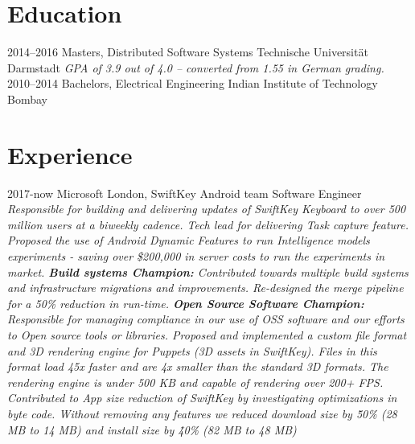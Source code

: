 \documentclass[]{friggeri-cv}
\begin{document}
\section{Education}
    \begin{entrylist}
        \entry
            {2014–2016}
            {Masters, {\normalfont Distributed Software Systems}}
            {Technische Universität Darmstadt}
            {\emph{GPA of 3.9 out of 4.0 -- converted from 1.55 in German grading.}}
        \entry
            {2010–2014}
            {Bachelors, {\normalfont Electrical Engineering}}
            {Indian Institute of Technology Bombay}
            {}%
    \end{entrylist}
    \vspace{-0.3cm}

\section{Experience}
    \begin{entrylist}
        \entry
            {2017-now}
            {Microsoft London, SwiftKey Android team}
            {Software Engineer}
            {\emph{Responsible for building and delivering updates of SwiftKey Keyboard to over 500 million users at a biweekly cadence.
    	    \newline 
    	    \newline
    	    Tech lead for delivering Task capture feature. Proposed the use of Android Dynamic Features to run Intelligence models experiments - saving over \$200,000 in server costs to run the experiments in market.
    	    \newline 
    	    \newline
    	    \textbf{Build systems Champion:} Contributed towards multiple build systems and infrastructure migrations and improvements. Re-designed the merge pipeline for a 50\% reduction in run-time.
            \newline
            \newline
            \textbf{Open Source Software Champion:} Responsible for managing compliance in our use of OSS software and our efforts to Open source tools or libraries.
    	    \newline 
    	    \newline
    	    Proposed and implemented a custom file format and 3D rendering engine for Puppets (3D assets in SwiftKey). Files in this format load 45x faster and are 4x smaller than the standard 3D formats. The rendering engine is under 500 KB and capable of rendering over 200+ FPS.
            \newline
            \newline
            Contributed to App size reduction of SwiftKey by investigating optimizations in byte code. Without removing any features we reduced download size by \~50\% (28 MB to 14 MB) and install size by \~40\% (82 MB to 48 MB)}}
    \end{entrylist}
\end{document}
